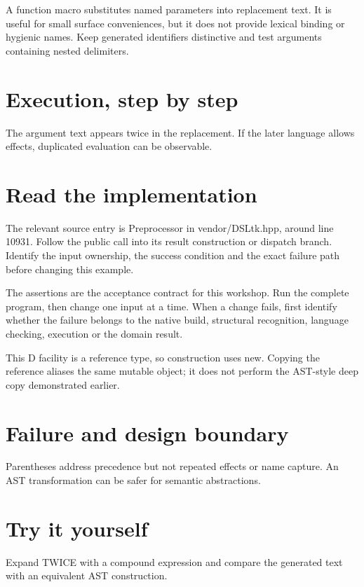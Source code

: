 \clearpage
{}
A function macro substitutes named parameters into replacement text. It is useful for small surface conveniences, but it does not provide lexical binding or hygienic names. Keep generated identifiers distinctive and test arguments containing nested delimiters.


\section*{Execution, step by step}
The argument text appears twice in the replacement. If the later language allows effects, duplicated evaluation can be observable.

\section*{Read the implementation}
The relevant source entry is Preprocessor in vendor/DSLtk.hpp, around line 10931. Follow the public call into its result construction or dispatch branch. Identify the input ownership, the success condition and the exact failure path before changing this example.

The assertions are the acceptance contract for this workshop. Run the complete program, then change one input at a time. When a change fails, first identify whether the failure belongs to the native build, structural recognition, language checking, execution or the domain result.

\clearpage
{}
This D facility is a reference type, so construction uses new. Copying the reference aliases the same mutable object; it does not perform the AST-style deep copy demonstrated earlier.


\section*{Failure and design boundary}
Parentheses address precedence but not repeated effects or name capture. An AST transformation can be safer for semantic abstractions.

\section*{Try it yourself}
Expand TWICE with a compound expression and compare the generated text with an equivalent AST construction.


